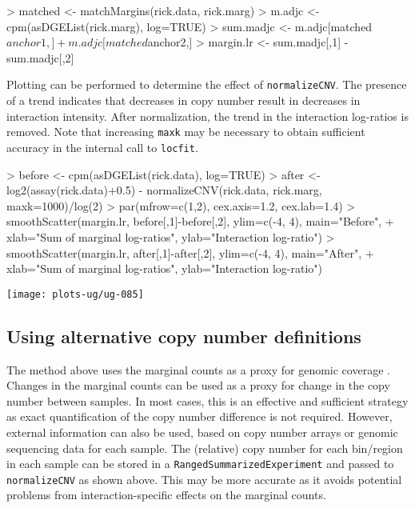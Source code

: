 \documentclass[12pt]{report}
\renewenvironment{Schunk}{\vspace{0pt}}{\vspace{0pt}}
\newcommand{\code}[1]{{\small\texttt{#1}}}
\begin{document}
\begin{Schunk}
\begin{Sinput}
> matched <- matchMargins(rick.data, rick.marg)
> m.adjc <- cpm(asDGEList(rick.marg), log=TRUE)
> sum.madjc <- m.adjc[matched$anchor1,] + m.adjc[matched$anchor2,]
> margin.lr <- sum.madjc[,1] - sum.madjc[,2]
\end{Sinput}
\end{Schunk}

Plotting can be performed to determine the effect of \code{normalizeCNV}.
The presence of a trend indicates that decreases in copy number result in decreases in interaction intensity.
After normalization, the trend in the interaction log-ratios is removed.
Note that increasing \code{maxk} may be necessary to obtain sufficient accuracy in the internal call to \code{locfit}.

\begin{Schunk}
\begin{Sinput}
> before <- cpm(asDGEList(rick.data), log=TRUE)
> after <- log2(assay(rick.data)+0.5) - normalizeCNV(rick.data, rick.marg, maxk=1000)/log(2)
> par(mfrow=c(1,2), cex.axis=1.2, cex.lab=1.4)
> smoothScatter(margin.lr, before[,1]-before[,2], ylim=c(-4, 4), main="Before",
+     xlab="Sum of marginal log-ratios", ylab="Interaction log-ratio")
> smoothScatter(margin.lr, after[,1]-after[,2], ylim=c(-4, 4), main="After",
+     xlab="Sum of marginal log-ratios", ylab="Interaction log-ratio")
\end{Sinput}
\end{Schunk}

\begin{center}
\texttt{[image: plots-ug/ug-085]}
\end{center}

\subsection{Using alternative copy number definitions}
The method above uses the marginal counts as a proxy for genomic coverage \cite{imakaev2012iterative}.
Changes in the marginal counts can be used as a proxy for change in the copy number between samples.     
In most cases, this is an effective and sufficient strategy as exact quantification of the copy number difference is not required.
However, external information can also be used, based on copy number arrays or genomic sequencing data for each sample.
The (relative) copy number for each bin/region in each sample can be stored in a \code{RangedSummarizedExperiment} and passed to \code{normalizeCNV} as shown above.
This may be more accurate as it avoids potential problems from interaction-specific effects on the marginal counts.
\end{document}
